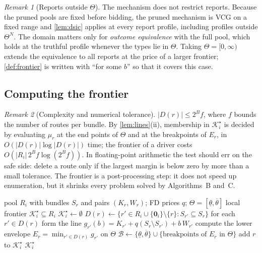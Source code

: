 \documentclass[11pt]{article}
\theoremstyle{definition}
\theoremstyle{remark}
\newtheorem{remark}{Remark}
\newcommand{\Ks}{\mathcal{K}^{\star}}
\newcommand{\thl}{\underline{\theta}}
\newcommand{\thu}{\overline{\theta}}
\newcommand{\idle}{\mathbf{0}}
\begin{document}
\begin{remark}[Reports outside \texorpdfstring{$\Theta$}{Theta}]
The mechanism does not restrict reports. Because the pruned pools are fixed
before bidding, the pruned mechanism is VCG on a fixed range and
\cref{lem:dsic} applies at every report profile, including profiles outside
$\Theta^N$. The domain matters only for \emph{outcome equivalence} with the full
pool, which holds at the truthful profile whenever the types lie in $\Theta$.
Taking $\Theta=[0,\infty)$ extends the equivalence to all reports at the price of
a larger frontier; \cref{def:frontier} is written with ``for some $b$'' so that
it covers this case.
\end{remark}

\subsection{Computing the frontier}

\begin{remark}[Complexity and numerical tolerance]\label{rem:computation}
$|D(r)|\le 2^B f$, where $f$ bounds the number of routes per bundle. By
\cref{lem:lines}(ii), membership in $\Ks_i$ is decided by evaluating $\mu_r$ at
the end points of $\Theta$ and at the breakpoints of $E_r$, in
$O(|D(r)|\log|D(r)|)$ time; the frontier of a driver costs
$O(|R_i|\,2^Bf\log(2^Bf))$. In floating-point arithmetic the test should err on
the safe side: delete a route only if the largest margin is below zero by more
than a small tolerance. The frontier is a post-processing step: it does not
speed up enumeration, but it shrinks every problem solved by Algorithms~B
and~C.
\end{remark}

\begin{algorithm}[!htbp]
\caption{\textsc{Frontier}$(R_i,q,\Theta)$: the rule $\Pi^\star$ for one driver}
\label{alg:frontier}
\begin{algorithmic}[1]
\Require pool $R_i$ with bundles $S_r$ and pairs $(K_r,W_r)$; FD prices $q$; $\Theta=[\thl,\thu]$
\Ensure local frontier $\Ks_i\subseteq R_i$
\State $\Ks_i\gets\emptyset$
  \State $D(r)\gets\{r'\in R_i\cup\{\idle_i\}\setminus\{r\}:S_{r'}\subseteq S_r\}$
  \State for each $r'\in D(r)$ form the line $g_{r'}(b)=K_{r'}+q(S_r\setminus S_{r'})+b\,W_{r'}$
  \State compute the lower envelope $E_r=\min_{r'\in D(r)}g_{r'}$ on $\Theta$ 
  \State $\mathcal B\gets\{\thl,\thu\}\cup\{\text{breakpoints of }E_r\text{ in }\Theta\}$
   
    \State add $r$ to $\Ks_i$
  \EndIf
\EndFor
\State \Return $\Ks_i$
\end{algorithmic}
\end{algorithm}
\end{document}

